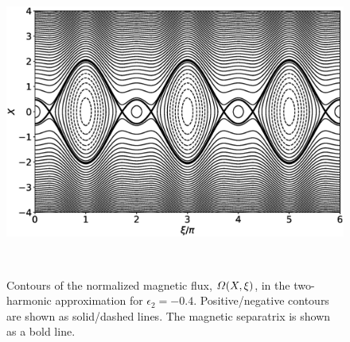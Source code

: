 \documentclass[12pt,prb,aps]{revtex4-1}
\begin{document}
\begin{figure}
\centerline{\includegraphics[height=4in]{Figure4.eps}}
\caption{Contours of the normalized magnetic flux, ${\mit\Omega}(X,\xi)$, in the two-harmonic approximation for 
$\epsilon_2=-0.4$. Positive/negative contours are shown as solid/dashed lines. The magnetic separatrix is shown
as a  bold line.}\label{fig4}
\end{figure}
\end{document}
